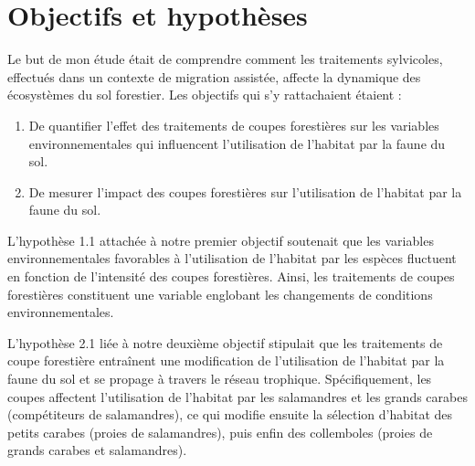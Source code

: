 \section*{Objectifs et hypothèses}
\label{sec:objectifs}

Le but de mon étude était de comprendre comment les traitements sylvicoles, effectués dans un contexte de migration assistée, 
affecte la dynamique des écosystèmes du sol forestier. Les objectifs qui s’y rattachaient étaient :

\begin{enumerate}
    \item De quantifier l'effet des traitements de coupes forestières sur les variables environnementales qui influencent l'utilisation de l'habitat par la faune du sol.
    \item De mesurer l'impact des coupes forestières sur l'utilisation de l'habitat par la faune du sol.
\end{enumerate}

L'hypothèse 1.1 attachée à notre premier objectif soutenait que les variables environnementales favorables à l'utilisation de l'habitat par les espèces fluctuent 
en fonction de l'intensité des coupes forestières. Ainsi, les traitements de coupes forestières constituent une variable englobant 
les changements de conditions environnementales.

L'hypothèse 2.1 liée à notre deuxième objectif stipulait que les traitements de coupe forestière entraînent une modification de l'utilisation de l'habitat 
par la faune du sol et se propage à travers le réseau trophique. Spécifiquement, les coupes affectent l'utilisation de l'habitat par les salamandres et 
les grands carabes (compétiteurs de salamandres), ce qui modifie ensuite la sélection d'habitat des petits carabes (proies de salamandres), puis enfin des collemboles (proies de grands carabes et salamandres).



\cleardoublepage



